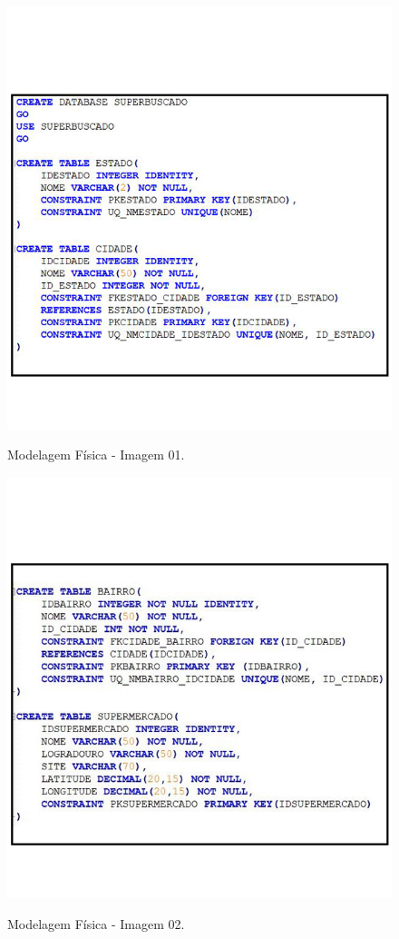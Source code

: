 \begin{figure}[H]
	\centering
	\caption{Modelagem Física - Imagem 01.}
	\includegraphics[scale=0.8]{Imagens/ModelagemFisica01.png}
	\label{fig:modelagemfisica01}
\end{figure}
			
\begin{figure}[H]
	\centering
    \caption{Modelagem Física - Imagem 02.}
    \includegraphics[scale=0.8]{Imagens/ModelagemFisica02.png}
    \label{fig:modelagemfisica02}
\end{figure}
			
